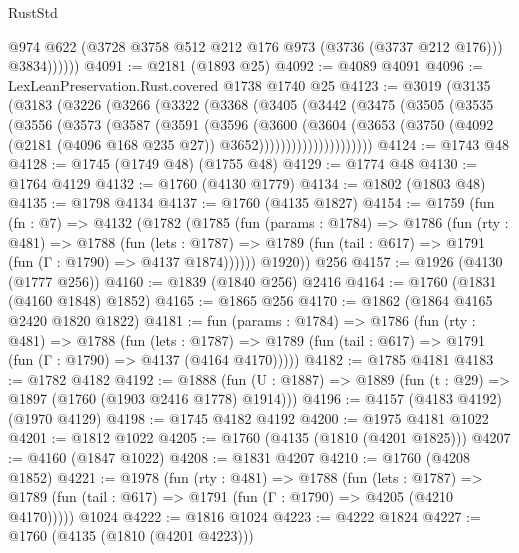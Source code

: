 \begin{lexlean}{RustStd}
\begin{coremodule}
                @974
                @622
                (@3728 @3758 @512 @212 @176 @973 (@3736 (@3737 @212 @176)))
                @3834))))))
@4091 := @2181 (@1893 @25)
@4092 := @4089 @4091
@4096 := LexLeanPreservation.Rust.covered @1738 @1740 @25
@4123 := @3019
    (@3135
      (@3183
        (@3226
          (@3266
            (@3322
              (@3368
                (@3405
                  (@3442
                    (@3475
                      (@3505
                        (@3535
                          (@3556
                            (@3573
                              (@3587
                                (@3591
                                  (@3596
                                    (@3600
                                      (@3604
                                        (@3653
                                          (@3750
                                            (@4092
                                              (@2181 (@4096 @168 @235 @27))
                                              @3652)))))))))))))))))))))
@4124 := @1743 @48
@4128 := @1745 (@1749 @48) (@1755 @48)
@4129 := @1774 @48
@4130 := @1764 @4129
@4132 := @1760 (@4130 @1779)
@4134 := @1802 (@1803 @48)
@4135 := @1798 @4134
@4137 := @1760 (@4135 @1827)
@4154 := @1759
    (fun (fn : @7) =>
    @4132
      (@1782
        (@1785
          (fun (params : @1784) =>
          @1786
            (fun (rty : @481) =>
            @1788
              (fun (lets : @1787) =>
              @1789 (fun (tail : @617) => @1791 (fun (Γ : @1790) => @4137 @1874))))))
        @1920))
    @256
@4157 := @1926 (@4130 (@1777 @256))
@4160 := @1839 (@1840 @256) @2416
@4164 := @1760 (@1831 (@4160 @1848) @1852)
@4165 := @1865 @256
@4170 := @1862 (@1864 @4165 @2420 @1820 @1822)
@4181 := fun (params : @1784) =>
  @1786
    (fun (rty : @481) =>
    @1788
      (fun (lets : @1787) =>
      @1789 (fun (tail : @617) => @1791 (fun (Γ : @1790) => @4137 (@4164 @4170)))))
@4182 := @1785 @4181
@4183 := @1782 @4182
@4192 := @1888 (fun (U : @1887) => @1889 (fun (t : @29) => @1897 (@1760 (@1903 @2416 @1778) @1914)))
@4196 := @4157 (@4183 @4192) (@1970 @4129)
@4198 := @1745 @4182 @4192
@4200 := @1975 @4181 @1022
@4201 := @1812 @1022
@4205 := @1760 (@4135 (@1810 (@4201 @1825)))
@4207 := @4160 (@1847 @1022)
@4208 := @1831 @4207
@4210 := @1760 (@4208 @1852)
@4221 := @1978
    (fun (rty : @481) =>
    @1788
      (fun (lets : @1787) =>
      @1789 (fun (tail : @617) => @1791 (fun (Γ : @1790) => @4205 (@4210 @4170)))))
    @1024
@4222 := @1816 @1024
@4223 := @4222 @1824
@4227 := @1760 (@4135 (@1810 (@4201 @4223)))

\end{coremodule}
\end{lexlean}
